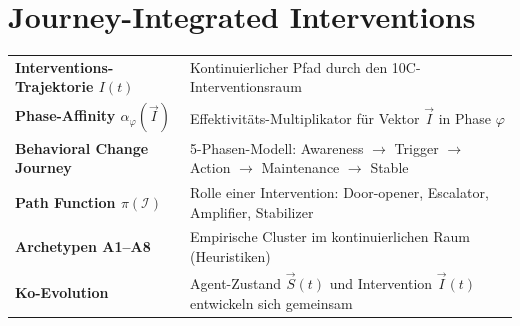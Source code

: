 %
%
%
%

\chapter{Journey-Integrated Interventions}
\label{ch:journey-integrated}

\begin{tcolorbox}[colback=blue!5!white, colframe=blue!75!black,
    title=Zentrale Begriffe in diesem Kapitel]
\small
\begin{tabular}{@{}ll@{}}
\textbf{Interventions-Trajektorie $I(t)$} & Kontinuierlicher Pfad durch den 10C-Interventionsraum \\
\textbf{Phase-Affinity $\alpha_{\varphi}(\vec{I})$} & Effektivit\"{a}ts-Multiplikator f\"{u}r Vektor $\vec{I}$ in Phase $\varphi$ \\
\textbf{Behavioral Change Journey} & 5-Phasen-Modell: Awareness $\rightarrow$ Trigger $\rightarrow$ Action $\rightarrow$ Maintenance $\rightarrow$ Stable \\
\textbf{Path Function $\pi(\mathcal{I})$} & Rolle einer Intervention: Door-opener, Escalator, Amplifier, Stabilizer \\
\textbf{Archetypen A1--A8} & Empirische Cluster im kontinuierlichen Raum (Heuristiken) \\
\textbf{Ko-Evolution} & Agent-Zustand $\vec{S}(t)$ und Intervention $\vec{I}(t)$ entwickeln sich gemeinsam \\
\end{tabular}
\end{tcolorbox}

